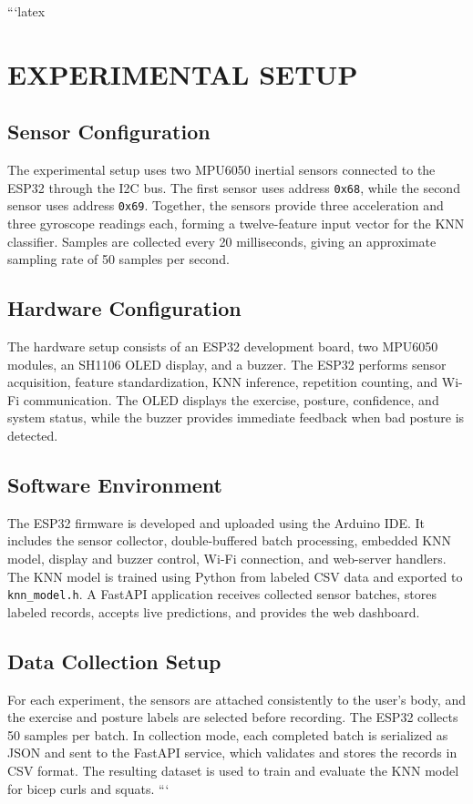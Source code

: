 ```latex
\chapter{EXPERIMENTAL SETUP}

\section{Sensor Configuration}

The experimental setup uses two MPU6050 inertial sensors connected to the ESP32
through the I2C bus. The first sensor uses address \texttt{0x68}, while the
second sensor uses address \texttt{0x69}. Together, the sensors provide three
acceleration and three gyroscope readings each, forming a twelve-feature input
vector for the KNN classifier. Samples are collected every 20 milliseconds,
giving an approximate sampling rate of 50 samples per second.

\section{Hardware Configuration}

The hardware setup consists of an ESP32 development board, two MPU6050 modules,
an SH1106 OLED display, and a buzzer. The ESP32 performs sensor acquisition,
feature standardization, KNN inference, repetition counting, and Wi-Fi
communication. The OLED displays the exercise, posture, confidence, and system
status, while the buzzer provides immediate feedback when bad posture is
detected.

\section{Software Environment}

The ESP32 firmware is developed and uploaded using the Arduino IDE. It includes
the sensor collector, double-buffered batch processing, embedded KNN model,
display and buzzer control, Wi-Fi connection, and web-server handlers. The KNN
model is trained using Python from labeled CSV data and exported to
\texttt{knn\_model.h}. A FastAPI application receives collected sensor batches,
stores labeled records, accepts live predictions, and provides the web
dashboard.

\section{Data Collection Setup}

For each experiment, the sensors are attached consistently to the user's body,
and the exercise and posture labels are selected before recording. The ESP32
collects 50 samples per batch. In collection mode, each completed batch is
serialized as JSON and sent to the FastAPI service, which validates and stores
the records in CSV format. The resulting dataset is used to train and evaluate
the KNN model for bicep curls and squats.
```
